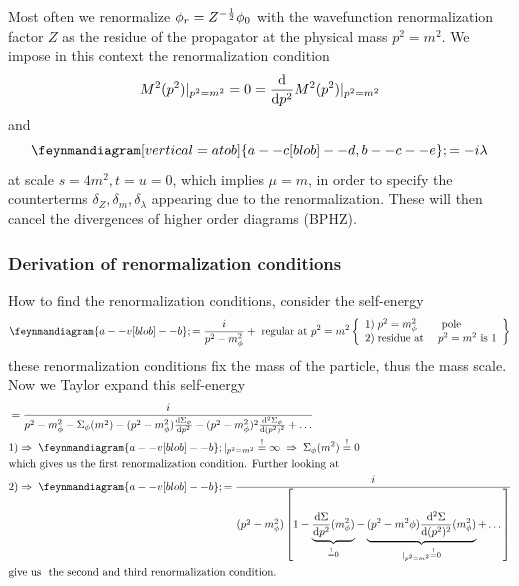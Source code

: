 Most often we renormalize $\phi_r=Z^{-\frac{1}{2}} \phi_0$ with the wavefunction renormalization factor $Z$ as the residue of the propagator at the physical mass $p^2=m^2$. We impose in this context the renormalization condition
\begin{equation}
	M^2(p^2) |_{p^2=m^2} = 0 = \frac{\mathrm{d}}{\mathrm{d} p^2} M^2(p^2) |_{p^2=m^2}
\end{equation}
and
\begin{equation}
	\feynmandiagram[vertical=a to b]{a--c[blob]--d, b--c--e}; = -i \lambda 
\end{equation}
at scale $s=4m^2, t=u=0$, which implies $\mu=m$, in order to specify the counterterms $\delta_Z,\delta_m,\delta_{\lambda}$ appearing due to the renormalization. These will then cancel the divergences of higher order diagrams (BPHZ).
\subsubsection{Derivation of renormalization conditions}
How to find the renormalization conditions, consider the self-energy
\begin{equation*}
	\feynmandiagram{a--v[blob] --b};= \frac{i}{p^2-m^2_{\phi}} +\text{ regular at }p^2=m^2\left\{  \begin{array}{ll}
		1)\;p^2=m^2_{\phi} & \text{ pole}\\
		2)\;\text{residue at } &p^2=m^2 \text{ is }1\\
	\end{array}  \right\}
\end{equation*}
these renormalization conditions fix the mass of the particle, thus the mass scale.\\
Now we Taylor expand this self-energy
\begin{align*}
	&= \frac{i}{p^2-m^2_{\phi}-\Sigma_\phi(m^2) -(p^2-m^2_\phi) \frac{\md \Sigma_\phi}{\md p^2} -(p^2-m^2_\phi)^2 \frac{\md^2 \Sigma_\phi}{\md (p^2)^2} +\dots}\\
	&1) \Rightarrow\; \feynmandiagram{a--v[blob] --b};|_{p^2=m^2} \stackrel{!}{=} \infty \;\Rightarrow \; \Sigma_\phi(m^2)\stackrel{!}{=} 0\\
	&\text{which gives}  \text{ us the first renormalization condition. Further looking at }\\
	&2) \Rightarrow \;\feynmandiagram{a--v[blob] --b}; = \frac{i}{(p^2-m^2_\phi) \left[1-\underbrace{\frac{\md \Sigma}{\md p^2}(m^2_\phi)}_{\stackrel{!}{=}0} - \underbrace{(p^2-m^2\phi) \frac{\md^2 \Sigma}{\md(p^2)^2} (m^2_\phi)}_{|_{p^2=m^2} \stackrel{!}{=}0}+\dots \right]}\\
	&\text{give us }\text{ the second and third renormalization condition.}
\end{align*}











